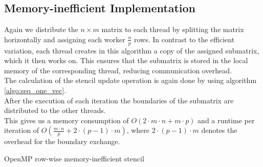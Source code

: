 \documentclass[11pt,a4paper]{article}
\begin{document}
\subsection{Memory-inefficient Implementation}
Again we distribute the $n\times m$ matrix to each thread by splitting the matrix horizontally and assigning each worker $\frac{n}{p}$ rows. In contrast to the efficient variation, each thread creates in this algorithm a copy of the assigned submatrix, which it then works on. This ensures that the submatrix is stored in the local memory of the corresponding thread, reducing communication overhead.\\
The calculation of the stencil update operation is again done by using algorithm \ref{algo:seq_one_vec}.\\
After the execution of each iteration the boundaries of the submatrix are distributed to the other threads.\\
This gives us a memory consumption of $O(2 \cdot m \cdot n + m \cdot p)$ and a runtime per iteration of $O(\frac{m \cdot n}{p} + 2 \cdot (p-1) \cdot m)$, where $2 \cdot (p-1) \cdot m$ denotes the overhead for the boundary exchange.\\

\begin{algorithm}[H] \label{algo:cilk}
 \caption{OpenMP row-wise memory-inefficient stencil}
\end{algorithm}
\end{document}
